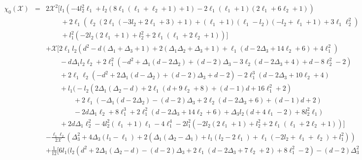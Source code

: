 \documentclass{article}
\begin{document}
\begin{eqnarray*}
\chi_0(\mathcal{X})&=&2 \mathcal{X}^2 \bigl[l_1 \left(-4 l_2^2 \ell _1+l_2 \left(8 \ell _1 \left(\ell _1+\ell _2+1\right)+1\right)-2 \ell _1 \left(\ell _1+1\right) \left(2 \ell _1+6 \ell _2+1\right)\right)\\
    &&\qquad\,+2 \ell _1 \left(\ell _2 \left(2 \ell _1 \left(-3 l_2+2 \ell _1+3\right)+1\right)+\left(\ell _1+1\right) \left(\ell _1-l_2\right) \left(-l_2+\ell _1+1\right)+3 \ell _1 \ell _2^2\right)\\
    &&\qquad\,+l_1^2 \left(-2 l_2 \left(2 \ell _1+1\right)+l_2^2+2 \ell _1 \left(\ell _1+2 \ell _2+1\right)\right)\bigr]\\
&&+\mathcal{X} \bigl[2 \ell_1 l_2 \left(d^2-d \left(\Delta _1+\Delta _3+1\right)+2 \left(\Delta _1 \Delta _2+\Delta _3+1\right)+\ell _1 \left(d-2 \Delta _3+14 \ell _2+6\right)+4 \ell _1^2\right)\\
&&\qquad-d \Delta _1 l_2 \ell _2 +2\ell _1^2 \left(-d^2+\Delta _1 \left(d-2 \Delta _2\right)+(d-2) \Delta _3-3 \ell _2 \left(d-2 \Delta _3+4\right)+d-8 \ell _2^2-2\right)\\
&&\qquad+2\ell _1 \ell _2 \left(-d^2+2 \Delta _1 \left(d-\Delta _2\right)+(d-2) \Delta _3+d-2\right)-2\ell _1^3 \left(d-2 \Delta _3+10 \ell _2+4\right)\\
&&\qquad+l_1 \bigl(-l_2 \left(2 \Delta _1 \left(\Delta _2-d\right)+2 \ell _1 \left(d+9 \ell _2+8\right)+(d-1) d+16 \ell _1^2+2\right)\\
&&\qquad \qquad +2\ell _1 \left(-\Delta _1 \left(d-2 \Delta _2\right)-(d-2) \Delta _3+2 \ell _2 \left(d-2 \Delta _3+6\right)+(d-1) d+2\right)\\
&& \qquad \qquad -2d \Delta _1 \ell _2+8 \ell _1^3+2\ell _1^2 \left(d-2 \Delta _3+14 \ell _2+6\right)+\Delta _3 l_2 \left(d+4 \ell _1-2\right)+8 l_2^2 \ell _1\bigr)\\
&&\qquad+2d \Delta _1 \ell _2^2-4 l_2^2 \left(\ell _1+1\right) \ell _1-4 \ell _1^4-2 l_1^2 \left(-2 l_2 \left(2 \ell _1+1\right)+l_2^2+2 \ell _1 \left(\ell _1+2 \ell _2+1\right)\right)\bigr]\\
&&-\frac{\ell _1 \ell _2}{2 \mathcal{X}} \left(\Delta _3^2+4 \Delta _3 \left(l_1-\ell _1\right)+2 \left(\Delta _1 \left(\Delta _2-\Delta _1\right)+l_1 \left(l_2-2 \ell _1\right)+\ell _1 \left(-2 l_2+\ell _1+\ell _2\right)+l_1^2\right)\right)\\
&&+\frac{1}{12} \bigl[6 l_1 \bigl(l_2 \left(d^2+2 \!\Delta _1 \left(\Delta _2\!-d\right)-(d-2) \Delta _3+2 \ell _1 \left(d-2 \Delta _3+7 \ell _2+2\right)+8 \ell _1^2-2\right)\!-\!(d\!-\!2) \Delta _3^2\\

\end{eqnarray*}
\end{document}
